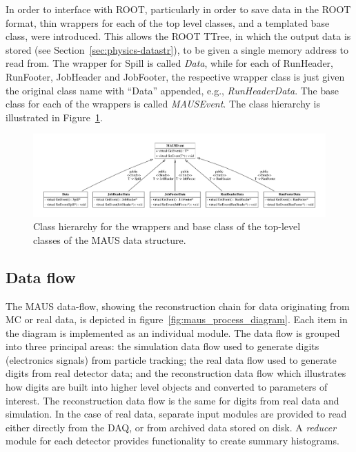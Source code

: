 \documentclass[11pt,a4paper]{article}
\begin{document}
In order to interface with ROOT, particularly in order to save data in the ROOT format, thin wrappers for each of the top level classes, and a templated base class, were introduced. This allows the ROOT TTree, in which the output data is stored (see Section~\ref{sec:physics-datastr}), to be given a single memory address to read from. The wrapper for Spill is called \emph{Data}, while for each of RunHeader, RunFooter, JobHeader and JobFooter, the respective wrapper class is just given the original class name with ``Data'' appended, e.g., \emph{RunHeaderData}. The base class for each of the wrappers is called \emph{MAUSEvent}. The class hierarchy is illustrated in Figure~\ref{fig:top-level}.

\begin{figure}[htb]
\centering
\includegraphics[width=1.03\textwidth]{figs/top_level.pdf}
\caption{Class hierarchy for the wrappers and base class of the top-level classes of the MAUS data structure.}
\label{fig:top-level}
\end{figure}

\subsection{Data flow}\label{sec:maus-dataflow}

The MAUS data-flow, showing the reconstruction chain for data originating from MC or real data, is depicted in figure~\ref{fig:maus_process_diagram}. Each item in the diagram is implemented as an individual module. The data flow is grouped into three principal areas: the simulation data flow used to generate digits (electronics signals) from particle tracking; the real data flow used to generate digits from real detector data; and the reconstruction data flow which illustrates how digits are built into higher level objects and converted to parameters of interest. The reconstruction data flow is the same for digits from real data and simulation.  In the case of real data, separate input modules are provided to read either directly from the DAQ, or from archived data stored on disk. A \textit{reducer} module for each detector provides functionality to create summary histograms.
\end{document}
